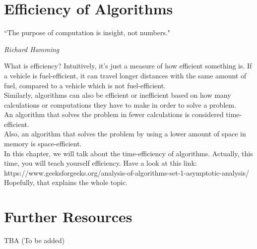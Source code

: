 \documentclass[letterpaper, 12pt]{book}
\begin{document}
\chapter{Efficiency of Algorithms}
\epigraph{\centering ``The purpose of computation is insight, not numbers."}{\textit{Richard Hamming}}
What is efficiency? Intuitively, it's just a measure of how efficient something is. If a vehicle is fuel-efficient, it can travel longer distances with the same amount of fuel, compared to a vehicle which is not fuel-efficient.\\
Similarly, algorithms can also be efficient or inefficient based on how many calculations or computations they have to make in order to solve a problem.\\
An algorithm that solves the problem in fewer calculations is considered time-efficient.\\
Also, an algorithm that solves the problem by using a lower amount of space in memory is space-efficient.\\
In this chapter, we will talk about the time-efficiency of algorithms. Actually, this time, you will teach yourself efficiency. Have a look at this link:\\
https://www.geeksforgeeks.org/analysis-of-algorithms-set-1-asymptotic-analysis/ \\
Hopefully, that explains the whole topic.
\chapter{Further Resources}
TBA (To be added)
\end{document}
